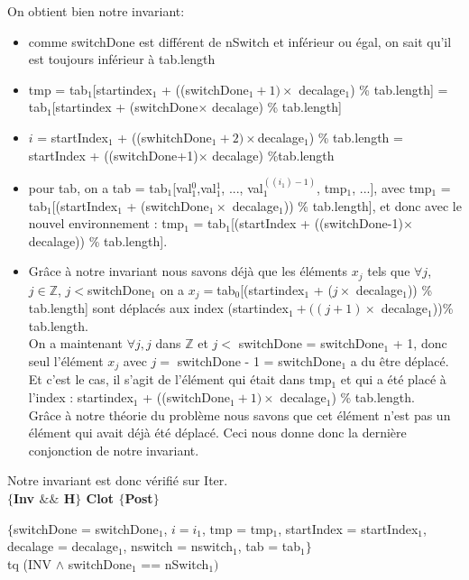 On obtient bien notre invariant:
\begin{itemize}
	\item comme switchDone est différent de nSwitch et inférieur ou égal, on sait qu'il est toujours inférieur à tab.length
	\item tmp = tab$_{1}$[startindex$_{1}$ + ((switchDone$_{1}+1)\times $ decalage$_{1}$) \% tab.length] 
		\subitem = tab$_{1}$[startindex + (switchDone$\times$ decalage) \% tab.length]
	\item $i$ = startIndex$_{1}$ + ((swhitchDone$_{1}+2)\times $decalage$_{1}$) \% tab.length
		\subitem = startIndex + ((switchDone+1)$\times$ decalage) \%tab.length
	\item pour tab, on a tab = tab$_{1}$[val$_{1}^{0}$,val$_{1}^{1}$, ..., val$_{1}^{((i_{1})-1)}$, tmp$_{1}$, ...], avec tmp$_{1}$ = tab$_{1}$[(startIndex$_{1}$ + (switchDone$_{1}\times$ decalage$_{1}$)) \% tab.length], et donc avec le nouvel environnement : tmp$_{1}$ = tab$_{1}$[(startIndex + ((switchDone-1)$\times$ decalage)) \% tab.length]. 
	\item Grâce à notre invariant nous savons déjà que les éléments $x_{j}$ tels que $\forall j$, $j \in \mathbb{Z}$, $j<$switchDone$_{1}$ on a $x_{j}=$tab$_{0}$[(startindex$_{1}$ + ($j\times$ decalage$_{1}$)) \% tab.length] sont déplacés aux index (startindex$_{1} + ((j+1)\times$ decalage$_{1}$))\% tab.length.\\
		On a maintenant $\forall j, j$ dans $\mathbb{Z}$ et $j<$ switchDone = switchDone$_{1}$ + 1, donc seul l'élément $x_{j}$ avec $j=$ switchDone - 1 = switchDone$_{1}$ a du être déplacé. Et c'est le cas, il s'agit de l'élément qui était dans tmp$_{1}$ et qui a été placé à l'index : startindex$_{1}$ + ((switchDone$_{1}+1)\times$ decalage$_{1}$) \% tab.length.\\
		Grâce à notre théorie du problème nous savons que cet élément n'est pas un élément qui avait déjà été déplacé. Ceci nous donne donc la dernière conjonction de notre invariant. \\
\end{itemize}

Notre invariant est donc vérifié sur Iter. \\

\textbf{$\{$Inv $\&\&$ H$\}$ Clot $\{$Post$\}$}

$\{$switchDone = switchDone$_{1}$, $i = i_{1}$, tmp = tmp$_{1}$, startIndex = startIndex$_{1}$, decalage = decalage$_{1}$, nswitch = nswitch$_{1}$, tab = tab$_{1}\}$\\ 
tq (INV $\wedge$ switchDone$_{1}$ == nSwitch$_{1})$ \\

